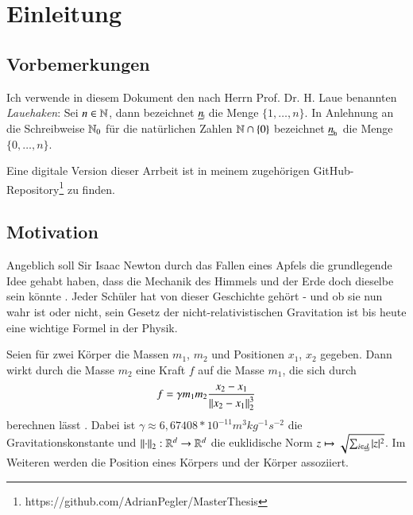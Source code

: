 \chapter{Einleitung}
\label{ch:einl}
  \section*{Vorbemerkungen}
    Ich verwende in diesem Dokument den nach Herrn Prof. Dr. H. Laue benannten \textit{Lauehaken}: Sei $n \in \mathbb{N}$, dann bezeichnet $\haken{n}$ die Menge $\{1, \dots ,n\}$.
    In Anlehnung an die Schreibweise $\mathbb{N}_0$ für die natürlichen Zahlen $\mathbb{N} \cap \{0\}$ bezeichnet $\nullhaken{n}$ die Menge $\{0, \dots , n\}$.
    
    Eine digitale Version dieser Arrbeit ist in meinem zugehörigen GitHub-Repository\footnote{https://github.com/AdrianPegler/MasterThesis} zu finden.
    
  \section{Motivation}
  \label{sec:mot}
    Angeblich soll Sir Isaac Newton durch das Fallen eines Apfels die grundlegende Idee gehabt haben, dass die Mechanik des Himmels und der Erde doch dieselbe sein 
    könnte \citep{memoirs}. Jeder Schüler hat von dieser Geschichte gehört - und ob sie nun wahr ist oder nicht, sein Gesetz der nicht-relativistischen Gravitation ist bis
    heute eine wichtige Formel in der Physik.
    
    Seien für zwei Körper die Massen $m_1$, $m_2$ und Positionen $x_1$, $x_2$ gegeben. Dann wirkt durch die Masse $m_2$ eine Kraft $f$ auf die Masse $m_1$, die sich durch 
    \begin{equation}
      f = \gamma m_1 m_2 \frac{x_2 - x_1}{\left\lVert x_2 - x_1\right\rVert^3_2}
      \label{eq:simple_grav}
    \end{equation}
    berechnen lässt \citep{newton}. Dabei ist $\gamma \approx 6{,}67408*10^{-11} m^3 kg^{-1} s^{-2}$ die Gravitationskonstante \citep{graviconst} und $\left\lVert\cdot\right\rVert_2: \mathbb{R}^d \to \mathbb{R}^d$ die 
    euklidische Norm $z \mapsto \sqrt{ \sum_{i \in \haken{d}} |z|^2 }$. Im Weiteren werden die Position eines Körpers und der Körper assoziiert. 
    
